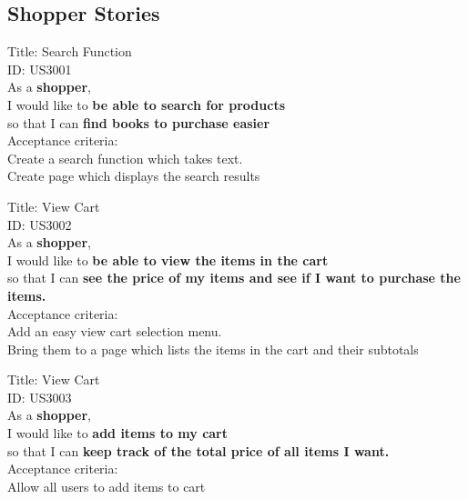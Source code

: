 \documentclass{article}
\begin{document}
\subsection{Shopper Stories}


\begin{framed}
\noindent
Title: Search Function \\
ID: US3001 \\
As a \textbf{shopper},\\
 \textbullet  \quad \quad I would like to \textbf{be able to search for products}\\ 
 \textbullet  \quad \quad so that I can \textbf{find books to purchase easier}\\
 Acceptance criteria: \\
  \textbullet  \quad \quad Create a search function which takes text. \\
  \textbullet  \quad \quad Create page which displays the search results \\
\end{framed}



\begin{framed}
\noindent
Title: View Cart \\
ID: US3002 \\
As a \textbf{shopper},\\
 \textbullet  \quad \quad I would like to \textbf{be able to view the items in the cart}\\ 
 \textbullet  \quad \quad so that I can \textbf{see the price of my items and see if I want to purchase the items.}\\
 Acceptance criteria: \\
  \textbullet  \quad \quad Add an easy view cart selection menu. \\
  \textbullet  \quad \quad Bring them to a page which lists the items in the cart and their subtotals\\
\end{framed}


\begin{framed}
\noindent
Title: View Cart \\
ID: US3003 \\
As a \textbf{shopper},\\
 \textbullet  \quad \quad I would like to \textbf{add items to my cart}\\ 
 \textbullet  \quad \quad so that I can \textbf{keep track of the total price of all items I want.}\\
 Acceptance criteria: \\
  \textbullet  \quad \quad Allow all users to add items to cart \\
\end{framed}
\end{document}
